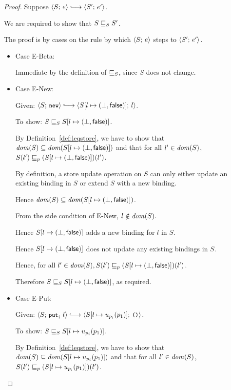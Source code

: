 \begin{proof}
  Suppose $\config{S}{e} \parstepsto \config{S'}{e'}$.

  We are required to show that $S \sqsubseteq_S S'$.

  The proof is by cases on the rule by which $\langle S;\, e \rangle$ steps to
  $\langle S';\, e' \rangle$.

  \begin{itemize}
  \item Case {\sc E-Beta}:

    Immediate by the definition of $ \sqsubseteq_S $, since $S$ does
    not change.

  \item Case {\sc E-New}:

    Given: $\config{S}{\NEW} \parstepsto
    \config{\extS{S}{l}{\bot}{\frozenfalse}}{l}$.

    To show: $S \sqsubseteq_S S[l \mapsto (\bot, \textsf{false})]$.

    By Definition~\ref{def:leqstore}, we have to show that $\mathit{dom}(S)
    \subseteq \mathit{dom}(S[l \mapsto (\bot, \textsf{false})])$ and that for
    all $l' \in \mathit{dom}(S)$, $S(l') \sqsubseteq_p
    (S[l \mapsto (\bot, \textsf{false})])(l')$.

    By definition, a store update operation on $S$ can only either
    update an existing binding in $S$ or extend $S$ with a new
    binding.

    Hence $\mathit{dom}(S) \subseteq \mathit{dom}(S[l \mapsto (\bot, \textsf{false})])$.

    From the side condition of {\sc E-New}, $l \notin \mathit{dom}(S)$.

    Hence $S[l \mapsto (\bot, \textsf{false})]$ adds a new binding for
    $l$ in $S$.

    Hence $S[l \mapsto (\bot, \textsf{false})]$ does not update any
    existing bindings in $S$.

    Hence, for all $l' \in \mathit{dom}(S), S(l') \sqsubseteq_p
    (S[l \mapsto (\bot, \textsf{false})])(l')$.

    Therefore $S \sqsubseteq_S S[l \mapsto (\bot, \textsf{false})]$, as
    required.

  \item Case {\sc E-Put}:

    Given: $\config{S}{\putiexp{l}} \parstepsto
    \config{\extSRaw{S}{l}{u_{p_i}(p_1)}}{\unit}$.

    To show: $S \sqsubseteq_S S[l \mapsto u_{p_i}(p_1)]$.

    By Definition~\ref{def:leqstore}, we have to show that $\mathit{dom}(S)
    \subseteq \mathit{dom}(S[l \mapsto u_{p_i}(p_1)])$ and that for all
    $l' \in \mathit{dom}(S)$, $S(l') \sqsubseteq_p
    (S[l \mapsto u_{p_i}(p_1)])(l')$.


\end{itemize}
\end{proof}
